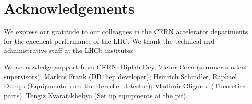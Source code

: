 \section*{Acknowledgements}
%
%

\noindent We express our gratitude to our colleagues in the CERN
accelerator departments for the excellent performance of the LHC. We
thank the technical and administrative staff at the LHCb
institutes.

We acknowledge support from CERN:
Biplab Dey, Victor Coco (summer student supervisors);
Markus Frank (DD4hep developer);
Heinrich Schindler, Raphael Dumps (Equipments from the Herschel detector);
Vladimir Gligorov (Theoretical parts);
Tengiz Kvaratskheliya (Set up equipments at the pit).

